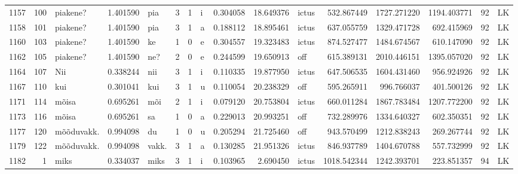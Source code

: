 \begin{tabular}{lrlrllllrrlrrrll}
1157 &         100 &         piakene? &  1.401590 &     pia &        3 &      1 &       i &      0.304058 &     18.649376 &  ictus &   532.867449 &  1727.271220 &  1194.403771 &     92 &        LK \\
1158 &         101 &         piakene? &  1.401590 &     pia &        3 &      1 &       a &      0.188112 &     18.895461 &  ictus &   637.055759 &  1329.471728 &   692.415969 &     92 &        LK \\
1160 &         103 &         piakene? &  1.401590 &      ke &        1 &      0 &       e &      0.304557 &     19.323483 &  ictus &   874.527477 &  1484.674567 &   610.147090 &     92 &        LK \\
1162 &         105 &         piakene? &  1.401590 &     ne? &        2 &      0 &       e &      0.244599 &     19.650913 &    off &   615.389131 &  2010.446151 &  1395.057020 &     92 &        LK \\
1164 &         107 &              Nii &  0.338244 &     nii &        3 &      1 &       i &      0.110335 &     19.877950 &  ictus &   647.506535 &  1604.431460 &   956.924926 &     92 &        LK \\
1167 &         110 &              kui &  0.301041 &     kui &        3 &      1 &       u &      0.110054 &     20.238329 &    off &   595.265911 &   996.766037 &   401.500126 &     92 &        LK \\
1171 &         114 &            mõisa &  0.695261 &     mõi &        2 &      1 &       i &      0.079120 &     20.753804 &  ictus &   660.011284 &  1867.783484 &  1207.772200 &     92 &        LK \\
1173 &         116 &            mõisa &  0.695261 &      sa &        1 &      0 &       a &      0.229013 &     20.993251 &    off &   732.289976 &  1334.640327 &   602.350351 &     92 &        LK \\
1177 &         120 &       mõõduvakk. &  0.994098 &      du &        1 &      0 &       u &      0.205294 &     21.725460 &    off &   943.570499 &  1212.838243 &   269.267744 &     92 &        LK \\
1179 &         122 &       mõõduvakk. &  0.994098 &   vakk. &        3 &      1 &       a &      0.130285 &     21.951326 &  ictus &   846.937789 &  1404.670788 &   557.732999 &     92 &        LK \\
1182 &           1 &             miks &  0.334037 &    miks &        3 &      1 &       i &      0.103965 &      2.690450 &  ictus &  1018.542344 &  1242.393701 &   223.851357 &     94 &        LK \\

\end{tabular}
